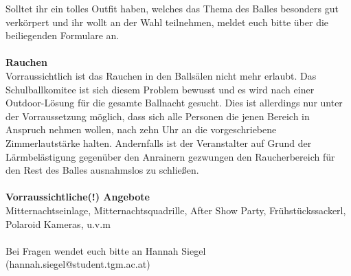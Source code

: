 \documentclass[12pt]{article}
\begin{document}
Solltet ihr ein tolles Outfit haben, welches das Thema des Balles besonders gut verkörpert und ihr wollt an der Wahl teilnehmen, meldet euch bitte über die beiliegenden Formulare an.
\\ \\
\textbf{Rauchen} \\
Vorraussichtlich ist das Rauchen in den Ballsälen nicht mehr erlaubt.
Das Schulballkomitee ist sich diesem Problem bewusst und es wird nach einer Outdoor-Lösung für die gesamte Ballnacht gesucht. Dies ist allerdings nur unter der Vorraussetzung möglich, dass sich alle Personen die jenen Bereich in Anspruch nehmen wollen, nach zehn Uhr an die vorgeschriebene Zimmerlautstärke halten.  Andernfalls ist der Veranstalter auf Grund der Lärmbelästigung gegenüber den Anrainern gezwungen den Raucherbereich für den Rest des Balles ausnahmslos zu schließen.\\ \\
\textbf{Vorraussichtliche(!) Angebote} \\
Mitternachtseinlage, Mitternachtsquadrille, After Show Party, Frühstückssackerl, Polaroid Kameras, u.v.m
\\ \\
Bei Fragen wendet euch bitte an Hannah Siegel (hannah.siegel@student.tgm.ac.at)
\end{document}
